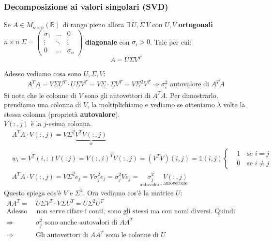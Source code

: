 \documentclass{article}
\begin{document}
\subsubsection{Decomposizione ai valori singolari (SVD)}
\begin{theo}{}{}
    Se $A\in M_{n\times n}(\mathbb R)$ di rango pieno allora $\exists\ U,\Sigma\ V$ con $U,V$ \textbf{ortogonali} $n\times n\ \Sigma=\begin{pmatrix}
            \sigma_1 & \dots  & 0        \\
            \vdots   & \ddots & \vdots   \\
            0        & \dots  & \sigma_n
        \end{pmatrix}
    $ \textbf{diagonale}
    con $\sigma_i>0$. Tale per cui:$$\boxed{A=U\Sigma V^T}$$
\end{theo}
Adesso vediamo cosa sono $U,\Sigma,V$:
\begin{align*}
    A^TA=V\Sigma U^T\cdot U\Sigma V^T=V\Sigma\cdot\Sigma V^T=V\Sigma^2 V^T\Rightarrow \sigma_i^2\text{ autovalore di }A^TA
\end{align*}
Si nota che le colonne di $V$ sono gli autovettori di $A^TA$. Per dimostrarlo, prendiamo una colonna di $V$, la moltiplichiamo e
vediamo se otteniamo $\lambda$ volte la stessa colonna (proprietà \textbf{autovalore}).\\
$V(:,j)$ è la $j$-esima colonna.
\begin{align*}
     & A^TA\cdot V(:,j)=V\Sigma^2\underbrace{V^TV(:,j)}_{w}                                                                                         \\
     & w_i=V^T(i,:)V(:j)=V(:,i)^TV(:,j)=\left(V^TV\right)(i,j)=\mathbb 1(i,j)\begin{cases}
                                                                                  & 1\quad\text{se }i=j    \\
                                                                                  & 0\quad\text{se }i\ne j
                                                                             \end{cases}                                              \\
     & A^TA\cdot V(:,j)=V\Sigma^2 e_j=V\sigma_j^2e_j=\sigma^2_jVe_j=\underset{\text{autovalore}}{\sigma^2_j}\ \underset{\text{autovettore}}{V(:,j)}
\end{align*}
Questo spiega cos'è $V$ e $\Sigma^2$. Ora vediamo cos'è la matrice $U$:
\begin{align*}
    AA^T=         & \ U\Sigma V^T\cdot V\Sigma U^T=U\Sigma^2 U^T                                           \\
    \text{Adesso} & \text{ non serve rifare i conti, sono gli stessi ma con nomi diversi. Quindi ottengo:} \\
    \Rightarrow   & \ \sigma_j^2\text{ sono anche autovalori di }AA^T                                      \\
    \Rightarrow   & \ \text{Gli autovettori di }AA^T\text{ sono le colonne di }U
\end{align*}
\end{document}
